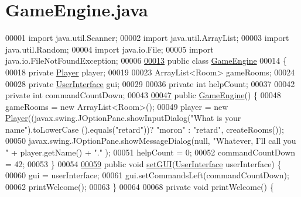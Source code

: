 \hypertarget{GameEngine_8java_source}{\section{Game\-Engine.\-java}
}

\begin{DoxyCode}
00001 \textcolor{keyword}{import} java.util.Scanner;
00002 \textcolor{keyword}{import} java.util.ArrayList;
00003 \textcolor{keyword}{import} java.util.Random;
00004 \textcolor{keyword}{import} java.io.File;
00005 \textcolor{keyword}{import} java.io.FileNotFoundException;
00006 
\hypertarget{GameEngine_8java_source_l00013}{}\hyperlink{classGameEngine}{00013} \textcolor{keyword}{public} \textcolor{keyword}{class }\hyperlink{classGameEngine}{GameEngine}
00014 \{
00018     \textcolor{keyword}{private} \hyperlink{classPlayer}{Player} player;
00019 
00023     ArrayList<Room> gameRooms;
00024 
00028     \textcolor{keyword}{private} \hyperlink{classUserInterface}{UserInterface} gui;
00029 
00036     \textcolor{keyword}{private} \textcolor{keywordtype}{int} helpCount;
00037 
00042     \textcolor{keyword}{private} \textcolor{keywordtype}{int} commandCountDown;
00043 
\hypertarget{GameEngine_8java_source_l00047}{}\hyperlink{classGameEngine_a9e8a92f5021a34293060f9aaff4005de}{00047}     \textcolor{keyword}{public} \hyperlink{classGameEngine_a9e8a92f5021a34293060f9aaff4005de}{GameEngine}() \{
00048         gameRooms = \textcolor{keyword}{new} ArrayList<Room>();
00049         player = \textcolor{keyword}{new} \hyperlink{classPlayer}{Player}((javax.swing.JOptionPane.showInputDialog(\textcolor{stringliteral}{"What is your name"}).toLowerCase
      ().equals(\textcolor{stringliteral}{"retard"}))? \textcolor{stringliteral}{"moron"} : \textcolor{stringliteral}{"retard"}, createRooms());
00050         javax.swing.JOptionPane.showMessageDialog(null, \textcolor{stringliteral}{"Whatever, I'll call you "} + player.getName() + \textcolor{stringliteral}{"."}
      );
00051         helpCount = 0;
00052         commandCountDown = 42;
00053     \}
00054 
\hypertarget{GameEngine_8java_source_l00059}{}\hyperlink{classGameEngine_aec901a5b590b3cd204f196165da5dfb6}{00059}     \textcolor{keyword}{public} \textcolor{keywordtype}{void} \hyperlink{classGameEngine_aec901a5b590b3cd204f196165da5dfb6}{setGUI}(\hyperlink{classUserInterface}{UserInterface} userInterface) \{
00060         gui = userInterface;
00061         gui.setCommandsLeft(commandCountDown);
00062         printWelcome();
00063     \}
00064 
00068     \textcolor{keyword}{private} \textcolor{keywordtype}{void} printWelcome() \{

\end{DoxyCode}

